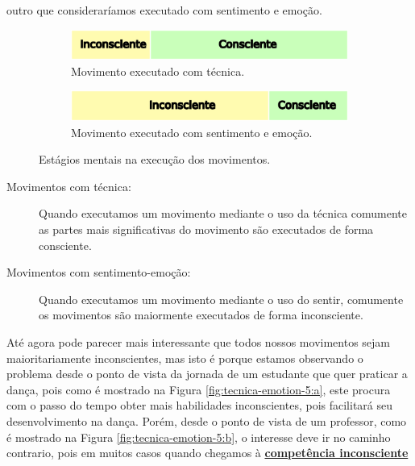 outro que consideraríamos executado com sentimento e emoção.
\begin{figure}[ht]
\centering
    \begin{subfigure}[t]{.48\textwidth}
      \centering
      \includegraphics[width=.975\linewidth]{chapters/cap-musicalidade-tecnica/tecnica-emotion-4a}  
      \caption{Movimento executado com técnica.}
      \label{fig:tecnica-emotion-4:a}
    \end{subfigure}
    \hfill
    \begin{subfigure}[t]{.48\textwidth}
      \centering
      \includegraphics[width=.975\linewidth]{chapters/cap-musicalidade-tecnica/tecnica-emotion-4b}  
      \caption{Movimento executado com sentimento e emoção.}
      \label{fig:tecnica-emotion-4:b}
    \end{subfigure}
    \caption{Estágios mentais na execução dos movimentos.}
    \label{fig:tecnica-emotion-4}
\end{figure}
\begin{description}
\item [Movimentos com técnica:] Quando executamos um movimento mediante o uso da técnica 
comumente as partes mais significativas do movimento são executados de forma consciente.
\item [Movimentos com sentimento-emoção:] Quando executamos um movimento mediante o uso do sentir, 
comumente os movimentos são maiormente executados de forma inconsciente.
\end{description}
Até agora pode parecer mais interessante que todos nossos movimentos sejam maioritariamente inconscientes,
mas isto é porque estamos observando o problema desde o ponto de vista da jornada de um estudante
que quer praticar a dança, pois como é mostrado na Figura \ref{fig:tecnica-emotion-5:a},
este procura com o passo do tempo obter mais habilidades inconscientes,
pois facilitará seu desenvolvimento na dança.
Porém, desde o ponto de vista de um professor,
como é mostrado na Figura \ref{fig:tecnica-emotion-5:b}, 
o interesse deve ir no caminho contrario,
pois em muitos casos quando chegamos à \hyperref[ref:CompetenciaInconsciente]{\textbf{competência inconsciente}}
